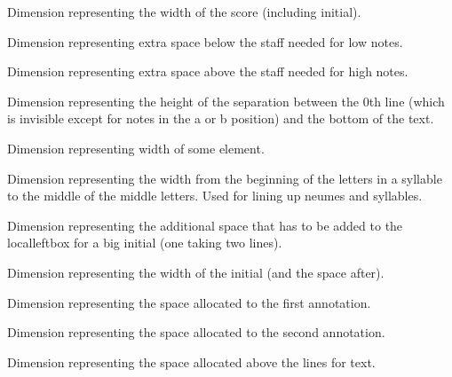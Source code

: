 Dimension representing the width of the score (including initial).

Dimension representing extra space below the staff needed for low notes.

Dimension representing extra space above the staff needed for high notes.

Dimension representing the height of the separation between the 0th
line (which is invisible except for notes in the a or b position) and
the bottom of the text.

Dimension representing width of some element.

Dimension representing the width from the beginning of the letters in
a syllable to the middle of the middle letters.  Used for lining up
neumes and syllables.
	
Dimension representing the additional space that has to be added to
the localleftbox for a big initial (one taking two lines).

Dimension representing the width of the initial (and the space after).

Dimension representing the space allocated to the first annotation.

Dimension representing the space allocated to the second annotation.

Dimension representing the space allocated above the lines for text.	

